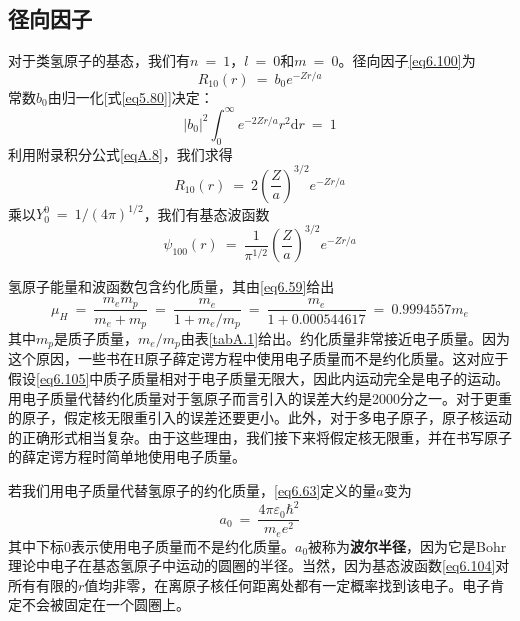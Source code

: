 \documentclass[12pt,a4paper,openany]{ctexbook}
\newcommand{\abs}[1]{\left| #1 \right|}
\newcommand{\dd}[1]{\mathrm{d} #1}
\newcommand{\paren}[1]{\left( #1 \right)}
\begin{document}
\subsection{径向因子}
\begin{flushleft}
    \setlength{\parindent}{2em}
对于类氢原子的基态，我们有$n\ =\ 1$，$l\ =\ 0$和$m\ =\ 0$。径向因子\eqref{eq6.100}为
\begin{equation}
    R_{10}(r)\ =\ b_0e^{-Zr/a} \label{eq6.102}
\end{equation}
常数$b_0$由归一化[式\eqref{eq5.80}]决定：
\begin{equation*}
    \abs{b_0}^2\int_0^{\infty}e^{-2Zr/a}r^2\dd r\ =\ 1
\end{equation*}
利用附录积分公式\eqref{eqA.8}，我们求得
\begin{equation}
    R_{10}(r)\ =\ 2\paren{\frac{Z}{a}}^{3/2}e^{-Zr/a} \label{eq6.103}
\end{equation}
乘以$Y_0^0\ =\ 1/(4\pi)^{1/2}$，我们有基态波函数
\begin{equation}
    \psi_{100}(r)\ =\ \frac{1}{\pi^{1/2}}\paren{\frac{Z}{a}}^{3/2}e^{-Zr/a} \label{eq6.104}
\end{equation}

氢原子能量和波函数包含约化质量，其由\eqref{eq6.59}给出
\begin{equation}
    \mu_H\ =\ \frac{m_em_p}{m_e+m_p}\ =\ \frac{m_e}{1+m_e/m_p}\ =\ \frac{m_e}{1+0.000544617}\ =\ 0.9994557m_e \label{eq6.105}
\end{equation}
其中$m_p$是质子质量，$m_e/m_p$由表\ref{tabA.1}给出。约化质量非常接近电子质量。因为这个原因，一些书在H原子薛定谔方程中使用电子质量而不是约化质量。这对应于假设\eqref{eq6.105}中质子质量相对于电子质量无限大，因此内运动完全是电子的运动。用电子质量代替约化质量对于氢原子而言引入的误差大约是2000分之一。对于更重的原子，假定核无限重引入的误差还要更小。此外，对于多电子原子，原子核运动的正确形式相当复杂。由于这些理由，我们接下来将假定核无限重，并在书写原子的薛定谔方程时简单地使用电子质量。

若我们用电子质量代替氢原子的约化质量，\eqref{eq6.63}定义的量$a$变为
\begin{equation}
    a_0\ =\ \frac{4\pi\varepsilon_0\hbar^2}{m_e e^2} \label{eq6.106}
\end{equation}
其中下标$0$表示使用电子质量而不是约化质量。$a_0$被称为\textbf{波尔半径}，因为它是Bohr理论中电子在基态氢原子中运动的圆圈的半径。当然，因为基态波函数\eqref{eq6.104}对所有有限的$r$值均非零，在离原子核任何距离处都有一定概率找到该电子。电子肯定不会被固定在一个圆圈上。


\end{flushleft}
\end{document}
